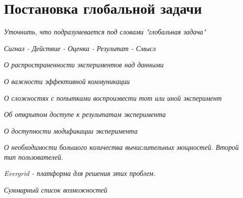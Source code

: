 \chapter{Постановка глобальной задачи}

\textit{Уточнить, что подразумевается под словами "глобальная задача"}

\textit{Сигнал - Действие - Оценка - Результат - Смысл}

\textit{О распространенности экспериментов над данными}

\textit{О важности эффективной коммуникации}

\textit{О сложностях с попытками воспроизвести тот или иной эксперимент}

\textit{Об открытом доступе к результатам эксперимента}

\textit{О доступности модификации эксперимента}

\textit{О необходимости большого количества вычислительных мощностей. Второй тип пользователей.}

\textit{Evergrid - платформа для решения этих проблем.}

\textit{Суммарный список возможностей}